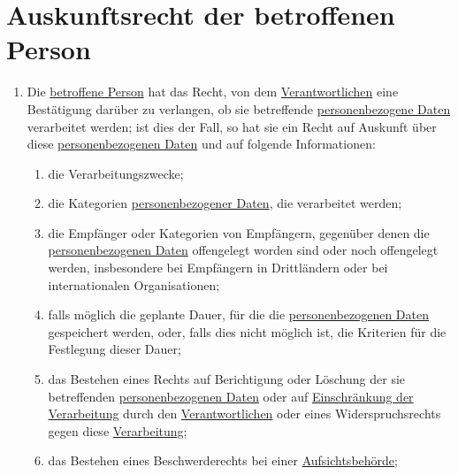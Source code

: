 \chapter{Auskunftsrecht der betroffenen Person}
\label{ch:15}


\begin{enumerate}

  \item Die \hyperref[itm:04-1]{betroffene Person} hat das Recht, von dem \hyperref[itm:04-7]{Verantwortlichen} eine Bestätigung darüber zu verlangen, ob sie
   betreffende \hyperref[itm:04-1]{personenbezogene Daten} verarbeitet werden; ist dies der Fall, so hat sie ein Recht auf Auskunft über
   diese \hyperref[itm:04-1]{personenbezogenen Daten} und auf folgende Informationen:
  \label{itm:15-1}

  \begin{enumerate}
  
    \item die Verarbeitungszwecke;
    \label{itm:15-1a}

    \item die Kategorien \hyperref[itm:04-1]{personenbezogener Daten}, die verarbeitet werden;
    \label{itm:15-1b}

    \item die Empfänger oder Kategorien von Empfängern, gegenüber denen die \hyperref[itm:04-1]{personenbezogenen Daten} offengelegt worden
     sind oder noch offengelegt werden, insbesondere bei Empfängern in Drittländern oder bei internationalen
     Organisationen;
    \label{itm:15-1c}

    \item falls möglich die geplante Dauer, für die die \hyperref[itm:04-1]{personenbezogenen Daten} gespeichert werden, oder, falls dies
     nicht möglich ist, die Kriterien für die Festlegung dieser Dauer;
    \label{itm:15-1d}

    \item das Bestehen eines Rechts auf Berichtigung oder Löschung der sie betreffenden \hyperref[itm:04-1]{personenbezogenen Daten} oder auf
     \hyperref[itm:04-3]{Einschränkung der Verarbeitung} durch den \hyperref[itm:04-7]{Verantwortlichen} oder eines Widerspruchsrechts gegen diese \hyperref[itm:04-2]{Verarbeitung};
    \label{itm:15-1e}

    \item das Bestehen eines Beschwerderechts bei einer \hyperref[itm:04-21]{Aufsichtsbehörde};
    \label{itm:15-1f}


\end{enumerate}
\end{enumerate}
